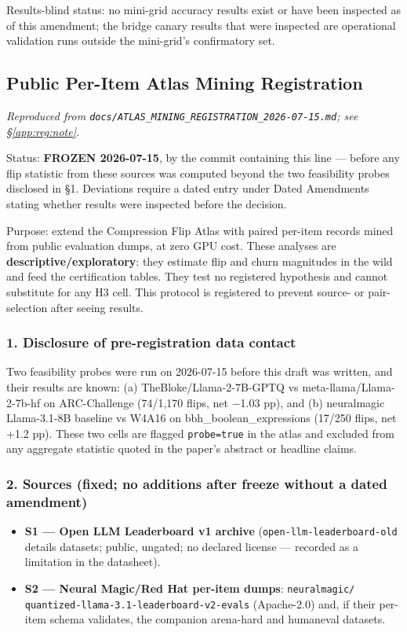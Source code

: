 Results-blind status: no mini-grid accuracy results exist or have been inspected as of this amendment; the bridge canary results that were inspected are operational validation runs outside the mini-grid's confirmatory set.


\subsection{Public Per-Item Atlas Mining Registration}
\label{app:reg:atlas}  %
\emph{Reproduced from \texttt{docs/\allowbreak{}ATLAS\_MINING\_REGISTRATION\_2026-\allowbreak{}07-\allowbreak{}15.md}; see \S\ref{app:reg:note}.}  %

Status: \textbf{FROZEN 2026-07-15}, by the commit containing this line --- before any flip statistic from these sources was computed beyond the two feasibility probes disclosed in \S{}1. Deviations require a dated entry under Dated Amendments stating whether results were inspected before the decision.

Purpose: extend the Compression Flip Atlas with paired per-item records mined from public evaluation dumps, at zero GPU cost. These analyses are \textbf{descriptive/exploratory}: they estimate flip and churn magnitudes in the wild and feed the certification tables. They test no registered hypothesis and cannot substitute for any H3 cell. This protocol is registered to prevent source- or pair-selection after seeing results.

\subsubsection{1. Disclosure of pre-registration data contact}
Two feasibility probes were run on 2026-07-15 before this draft was written, and their results are known: (a) TheBloke/Llama-2-7B-GPTQ vs meta-llama/Llama-2-7b-hf on ARC-Challenge (74/1,170 flips, net $-$1.03 pp), and (b) neuralmagic Llama-3.1-8B baseline vs W4A16 on bbh\_boolean\_expressions (17/250 flips, net +1.2 pp). These two cells are flagged \texttt{probe=true} in the atlas and excluded from any aggregate statistic quoted in the paper's abstract or headline claims.

\subsubsection{2. Sources (fixed; no additions after freeze without a dated amendment)}
\begin{itemize}
\item \textbf{S1 --- Open LLM Leaderboard v1 archive} (\texttt{open-\allowbreak{}llm-\allowbreak{}leaderboard-\allowbreak{}old} details datasets; public, ungated; no declared license --- recorded as a limitation in the datasheet).
\item \textbf{S2 --- Neural Magic/Red Hat per-item dumps}: \texttt{neuralmagic/\allowbreak{} quantized-\allowbreak{}llama-\allowbreak{}3.1-\allowbreak{}leaderboard-\allowbreak{}v2-\allowbreak{}evals} (Apache-2.0) and, if their per-item schema validates, the companion arena-hard and humaneval datasets.
\end{itemize}
